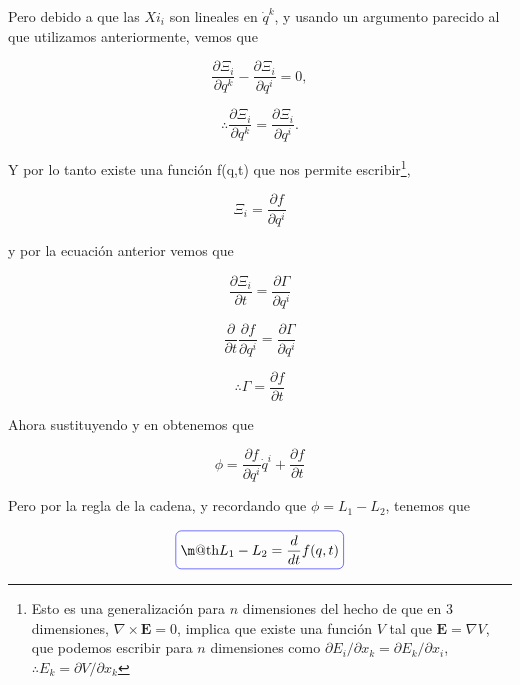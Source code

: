 \documentclass[a4paper,10pt]{article}
\makeatletter
\numberwithin{equation}{section}
\newcommand*{\boxcolor}{blue}
\renewcommand{\boxed}[1]{\textcolor{\boxcolor}{%
\tikz[baseline={([yshift=-1ex]current bounding box.center)}] \node [rectangle, minimum width=1ex,rounded corners,draw] {\normalcolor\m@th$\displaystyle#1$};}}
\makeatother
\begin{document}
Pero debido a que las $Xi_i$ son lineales en $\dot{q}^k$, y usando un argumento 
parecido al que utilizamos anteriormente, vemos que 

\begin{equation}
 \frac{\partial \Xi_i}{\partial q^k} - \frac{\partial \Xi_i}{\partial q^i} = 0,
\end{equation}

\begin{equation}
 \therefore \frac{\partial \Xi_i}{\partial q^k} = \frac{\partial \Xi_i}{\partial q^i}.
\end{equation}

Y por lo tanto existe una función f(q,t) que nos permite escribir\footnote{Esto es una 
generalización para $n$ dimensiones del hecho de que en 3 dimensiones, $\nabla \times \mathbf{E} = 0$,
implica que existe una función $V$ tal que $\mathbf{E} = \nabla V$, que podemos escribir para 
$n$ dimensiones como $\partial E_i / \partial x_k = \partial E_k / \partial x_i$, 
$\therefore E_k = \partial V / \partial x_k$},

\begin{equation}
 \Xi_i = \frac{\partial f}{\partial q^i}
 \label{eq:4xi2}
\end{equation}

y por la ecuación anterior vemos que 

\begin{equation}
 \frac{\partial \Xi_i}{\partial t} = \frac{\partial \Gamma}{\partial q^i}
\end{equation}

\begin{equation}
 \frac{\partial}{\partial t}\frac{\partial f}{\partial q^i} = \frac{\partial \Gamma}{\partial q^i}
\end{equation}

\begin{equation}
 \therefore \Gamma = \frac{\partial f}{\partial t}
 \label{eq:4gamma}
\end{equation}

Ahora sustituyendo  y  en  obtenemos que 

\begin{equation}
 \phi = \frac{\partial f}{\partial q^i}\dot{q}^i + \frac{\partial f}{\partial t}
\end{equation}

Pero por la regla de la cadena, y recordando que $\phi = L_1 - L_2$, tenemos que

\begin{equation}
 \boxed{L_1 - L_2 = \frac{d}{dt}f(q,t)}
\end{equation}
\end{document}
